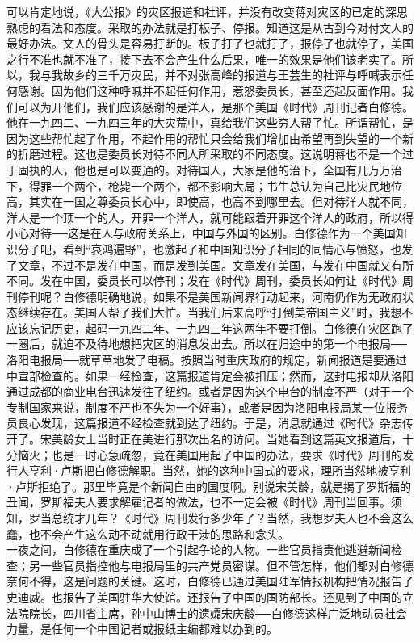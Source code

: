 可以肯定地说，《大公报》的灾区报道和社评，并没有改变蒋对灾区的已定的深思熟虑的看法和态度。采取的办法就是打板子、停报。知道这是从古到今对付文人的最好办法。文人的骨头是容易打断的。板子打了也就打了，报停了也就停了，美国之行不准也就不准了，接下去不会产生什么后果，唯一的效果是他们该老实了。所以，我与我故乡的三千万灾民，并不对张高峰的报道与王芸生的社评与呼喊表示任何感谢。因为他们这种呼喊并不起任何作用，惹怒委员长，甚至还起反面作用。我们可以为开他们，我们应该感谢的是洋人，是那个美国《时代》周刊记者白修德。他在一九四二、一九四三年的大灾荒中，真给我们这些穷人帮了忙。所谓帮忙，是因为这些帮忙起了作用，不起作用的帮忙只会给我们增加由希望再到失望的一个新的折磨过程。这也是委员长对待不同人所采取的不同态度。这说明蒋也不是一个过于固执的人，他也是可以变通的。对待国人，大家是他的治下，全国有几万万治下，得罪一个两个，枪毙一个两个，都不影响大局；书生总认为自己比灾民地位高，其实在一国之尊委员长心中，即使高，也高不到哪里去。但对待洋人就不同，洋人是一个顶一个的人，开罪一个洋人，就可能跟着开罪这个洋人的政府，所以得小心对待──这是在人与政府关系上，中国与外国的区别。白修德作为一个美国知识分子吧，看到“哀鸿遍野”，也激起了和中国知识分子相同的同情心与愤怒，也发了文章，不过不是发在中国，而是发到美国。文章发在美国，与发在中国就又有所不同。发在中国，委员长可以停刊；发在《时代》周刊，委员长如何让《时代》周刊停刊呢？白修德明确地说，如果不是美国新闻界行动起来，河南仍作为无政府状态继续存在。美国人帮了我们大忙。当我们后来高呼“打倒美帝国主义”时，我想不应该忘记历史，起码一九四二年、一九四三年这两年不要打倒。白修德在灾区跑了一圈后，就迫不及待地想把灾区的消息发出去。所以在归途中的第一个电报局──洛阳电报局──就草草地发了电稿。按照当时重庆政府的规定，新闻报道是要通过中宣部检查的。如果一经检查，这篇报道肯定会被扣压；然而，这封电报却从洛阳通过成都的商业电台迅速发往了纽约。或者是因为这个电台的制度不严（对于一个专制国家来说，制度不严也不失为一个好事），或者是因为洛阳电报局某一位报务员良心发现，这篇报道不经检查就到达了纽约。于是，消息就通过《时代》杂志传开了。宋美龄女士当时正在美进行那次出名的访问。当她看到这篇英文报道后，十分恼火；也是一时心急疏忽，竟在美国用起了中国的办法，要求《时代》周刊的发行人亨利·卢斯把白修德解职。当然，她的这种中国式的要求，理所当然地被亨利·卢斯拒绝了。那里毕竟是个新闻自由的国度啊。别说宋美龄，就是揭了罗斯福的丑闻，罗斯福夫人要求解雇记者的做法，也不一定会被《时代》周刊当回事。须知，罗当总统才几年？《时代》周刊发行多少年了？当然，我想罗夫人也不会这么蠢，也不会产生这么动不动就用行政干涉的思路和念头。\\

一夜之间，白修德在重庆成了一个引起争论的人物。一些官员指责他逃避新闻检查；另一些官员指控他与电报局里的共产党员密谋。但不管怎样，他们都对白修德奈何不得，这是问题的关键。这时，白修德已通过美国陆军情报机构把情况报告了史迪威。也报告了美国驻华大使馆。还报告了中国的国防部长。还见到了中国的立法院院长，四川省主席，孙中山博士的遗孀宋庆龄──白修德这样广泛地动员社会力量，是任何一个中国记者或报纸主编都难以办到的。\\

